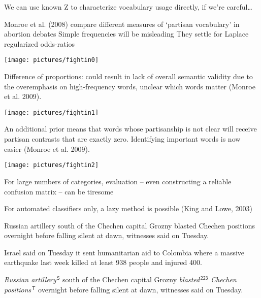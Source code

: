\documentclass{mediumfoils}
\newcommand{\mkred}[1]{\textsl{#1}}
\newcommand{\mkgreen}[1]{\textsl{#1}}
\newcommand{\mkblue}[1]{\textsl{#1}}
\begin{document}
We can use known Z to characterize vocabulary usage directly, if we're careful\ldots

Monroe et al. (2008) compare different measures of `partisan vocabulary' in abortion debates
\ita
\itm Simple frequencies will be misleading
\itm They settle for Laplace regularized odds-ratios
\itz

\newpage


\centerline{\texttt{[image: pictures/fightin0]}}

{\footnotesize Difference of proportions: could result in lack of overall semantic validity due to the overemphasis on high-frequency words, unclear which words matter (Monroe et al. 2009).}

\newpage
\centerline{\texttt{[image: pictures/fightin1]}}

{\footnotesize An additional prior means that words whose partisanship is not clear will receive partisan contrasts that are exactly zero. Identifying important words is now easier (Monroe et al. 2009).} 


\centerline{\texttt{[image: pictures/fightin2]}}



For large numbers of categories, evaluation -- even constructing a reliable confusion matrix -- can be tiresome

For automated classifiers only, a lazy method is possible (King and Lowe, 2003)

                                                                
Russian artillery south of the Chechen
capital Grozny blasted Chechen
positions overnight before falling silent
at dawn, witnesses said on Tuesday.

\noindent                                                                       
Israel said on Tuesday it sent
  humanitarian aid to
Colombia where a massive
  earthquake last week
killed at least 938 people and injured 400.


                                                                                                                               
\mkred{Russian artillery}$^{\,\mathsf{S}}$ south of the Chechen
capital
Grozny \mkgreen{blasted}$^{\,\mathsf{223}}$ \mkblue{Chechen
positions}$^{\,\mathsf{T}}$ overnight before falling silent
at dawn, witnesses said on Tuesday.
\end{document}

